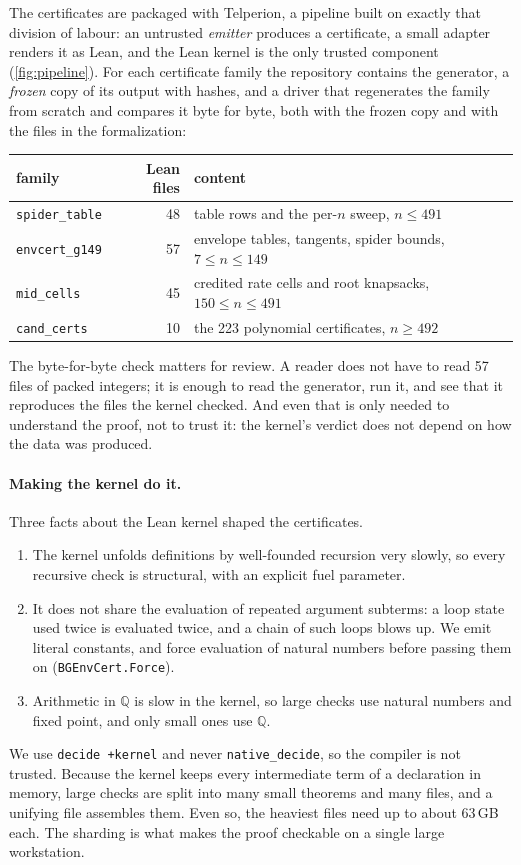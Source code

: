 \documentclass[11pt]{article}
\theoremstyle{definition}
\newcommand{\lean}[1]{\texttt{#1}}
\begin{document}
The certificates are packaged with Telperion, a pipeline built on exactly that division of labour: an
untrusted \emph{emitter} produces a certificate, a small adapter renders it as Lean, and the Lean kernel
is the only trusted component (\cref{fig:pipeline}). For each certificate family the repository contains
the generator, a \emph{frozen} copy of its output with hashes, and a driver that regenerates the family
from scratch and compares it byte for byte, both with the frozen copy and with the files in the
formalization:

\begin{center}\small
\begin{tabular}{@{}lrl@{}}
\toprule
family & Lean files & content \\
\midrule
\texttt{spider\_table} & 48 & table rows and the per-$n$ sweep, $n\le491$ \\
\texttt{envcert\_g149} & 57 & envelope tables, tangents, spider bounds, $7\le n\le149$ \\
\texttt{mid\_cells} & 45 & credited rate cells and root knapsacks, $150\le n\le491$ \\
\texttt{cand\_certs} & 10 & the 223 polynomial certificates, $n\ge492$ \\
\bottomrule
\end{tabular}
\end{center}

The byte-for-byte check matters for review. A reader does not have to read 57 files of packed integers;
it is enough to read the generator, run it, and see that it reproduces the files the kernel checked. And
even that is only needed to understand the proof, not to trust it: the kernel's verdict does not depend
on how the data was produced.

\paragraph{Making the kernel do it.} Three facts about the Lean kernel shaped the certificates.
\begin{enumerate}[label=(\roman*)]
\item The kernel unfolds definitions by well-founded recursion very slowly, so every recursive check is
  structural, with an explicit fuel parameter.
\item It does not share the evaluation of repeated argument subterms: a loop state used twice is
  evaluated twice, and a chain of such loops blows up. We emit literal constants, and force evaluation of
  natural numbers before passing them on (\lean{BGEnvCert.Force}).
\item Arithmetic in $\mathbb{Q}$ is slow in the kernel, so large checks use natural numbers and fixed
  point, and only small ones use $\mathbb{Q}$.
\end{enumerate}
We use \lean{decide +kernel} and never \lean{native\_decide}, so the compiler is not trusted. Because the
kernel keeps every intermediate term of a declaration in memory, large checks are split into many small
theorems and many files, and a unifying file assembles them. Even so, the heaviest files need
up to about $63$\,GB each. The sharding is what makes the proof checkable on a single large workstation.
\end{document}
